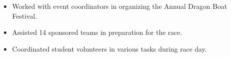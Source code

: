 \documentclass[10pt,letter]{altacv}
\begin{document}
\divider



\begin{itemize}
  \item Worked with event coordinators in organizing the Annual Dragon Boat Festival.
  \item Assisted 14 sponsored teams in preparation for the race.
  \item Coordinated student volunteers in various tasks during race day.
\end{itemize}



\clearpage
\end{document}
